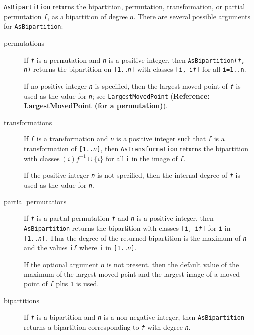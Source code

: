 \documentclass[a4paper,11pt]{report}
\begin{document}
{{{ \texttt{AsBipartition} returns the bipartition, permutation, transformation, or partial permutation \mbox{\texttt{\mdseries\slshape f}}, as a bipartition of degree \mbox{\texttt{\mdseries\slshape n}}. There are several possible arguments for \texttt{AsBipartition}: 
\begin{description}
\item[{permutations}]  If \mbox{\texttt{\mdseries\slshape f}} is a permutation and \mbox{\texttt{\mdseries\slshape n}} is a positive integer, then \texttt{AsBipartition(\mbox{\texttt{\mdseries\slshape f}}, \mbox{\texttt{\mdseries\slshape n}})} returns the bipartition on \texttt{[1..\mbox{\texttt{\mdseries\slshape n}}]} with classes \texttt{[i, i\texttt{}\mbox{\texttt{\mdseries\slshape f}}]} for all \texttt{i=1..n}.

 If no positive integer \mbox{\texttt{\mdseries\slshape n}} is specified, then the largest moved point of \mbox{\texttt{\mdseries\slshape f}} is used as the value for \mbox{\texttt{\mdseries\slshape n}}; see \texttt{LargestMovedPoint} (\textbf{Reference: LargestMovedPoint (for a permutation)}). 
\item[{transformations}]  If \mbox{\texttt{\mdseries\slshape f}} is a transformation and \mbox{\texttt{\mdseries\slshape n}} is a positive integer such that \mbox{\texttt{\mdseries\slshape f}} is a transformation of \texttt{[1..\mbox{\texttt{\mdseries\slshape n}}]}, then \texttt{AsTransformation} returns the bipartition with classes $(i)f^{-1}\cup \{i\}$ for all \texttt{i} in the image of \mbox{\texttt{\mdseries\slshape f}}.

 If the positive integer \mbox{\texttt{\mdseries\slshape n}} is not specified, then the internal degree of \mbox{\texttt{\mdseries\slshape f}} is used as the value for \mbox{\texttt{\mdseries\slshape n}}. 
\item[{partial permutations}]  If \mbox{\texttt{\mdseries\slshape f}} is a partial permutation \mbox{\texttt{\mdseries\slshape f}} and \mbox{\texttt{\mdseries\slshape n}} is a positive integer, then \texttt{AsBipartition} returns the bipartition with classes \texttt{[i, i\texttt{}\mbox{\texttt{\mdseries\slshape f}}]} for \texttt{i} in \texttt{[1..\mbox{\texttt{\mdseries\slshape n}}]}. Thus the degree of the returned bipartition is the maximum of \mbox{\texttt{\mdseries\slshape n}} and the values \texttt{i\texttt{}\mbox{\texttt{\mdseries\slshape f}}} where \texttt{i} in \texttt{[1..\mbox{\texttt{\mdseries\slshape n}}]}.

 If the optional argument \mbox{\texttt{\mdseries\slshape n}} is not present, then the default value of the maximum of the largest moved
point and the largest image of a moved point of \mbox{\texttt{\mdseries\slshape f}} plus \texttt{1} is used. 
\item[{bipartitions}]  If \mbox{\texttt{\mdseries\slshape f}} is a bipartition and \mbox{\texttt{\mdseries\slshape n}} is a non-negative integer, then \texttt{AsBipartition} returns a bipartition corresponding to \mbox{\texttt{\mdseries\slshape f}} with degree \mbox{\texttt{\mdseries\slshape n}}. 


\end{description}}}}
\end{document}
